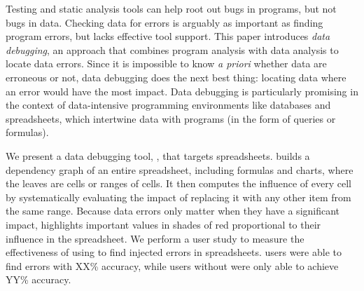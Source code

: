 Testing and static analysis tools can help root out bugs in programs,
but not bugs in data. Checking data for errors is arguably as
important as finding program errors, but lacks effective tool
support.
This paper introduces \emph{data debugging}, an approach that combines
program analysis with data analysis to locate data errors. Since it is
impossible to know \emph{a priori} whether data are erroneous or not,
data debugging does the next best thing: locating data where an error
would have the most impact. Data debugging is particularly promising
in the context of data-intensive programming environments like
databases and spreadsheets, which intertwine data with programs (in
the form of queries or formulas).

We present a data debugging tool, \checkcell{}, that targets
spreadsheets. \checkcell{} builds a dependency graph of an entire
spreadsheet, including formulas and charts, where the leaves are cells
or ranges of cells. It then computes the influence of every cell by
systematically evaluating the impact of replacing it with any other
item from the same range. Because data errors only matter when they
have a significant impact, \checkcell{} highlights important values in
shades of red proportional to their influence in the spreadsheet.  We
perform a user study to measure the effectiveness of using
\checkcell{} to find injected errors in spreadsheets. \checkcell{} users
were able to find errors with XX\% accuracy, while users without
\checkcell{} were only able to achieve YY\% accuracy.

